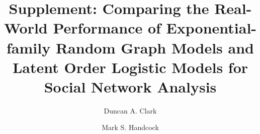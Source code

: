 \title[Supplement: Comparing the Real-World Performance of ERGMs and LOLOG Models for Social Network Analysis]{Supplement: Comparing the Real-World Performance of Exponential-family Random Graph Models and Latent Order Logistic Models for Social Network Analysis}


\author[Duncan A. Clark]{Duncan A. Clark}
\address{University of California - Los Angeles, Los Angeles, USA}

\author[Mark S. Handcock]{Mark S. Handcock}
\address{University of California - Los Angeles, Los Angeles, USA}



